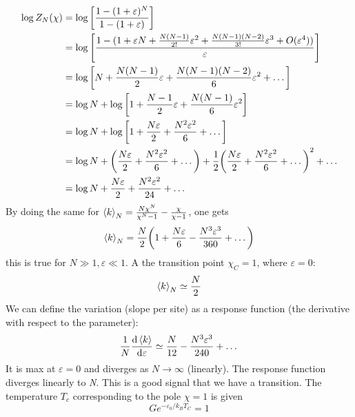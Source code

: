 \documentclass[../main/main.tex]{subfiles}
\begin{document}
\begin{equation}
\begin{split}
  \log{Z_N} (\chi)  &=  \log{\qty[\frac{1-(1+\varepsilon )^N}{1-(1+\varepsilon )}] }  \\
  & =   \log{\qty[\frac{1-(1+\varepsilon N  + \frac{N(N-1)}{2!}\varepsilon ^2 + \frac{N(N-1)(N-2)}{3!}\varepsilon ^3 +O(\varepsilon ^4))}{\varepsilon }] } \\
  & = \log{\qty[N + \frac{N(N-1)}{2}\varepsilon + \frac{N(N-1)(N-2)}{6}\varepsilon^2 + \dots]  } \\
  & = \log{N} + \log{\qty[1+\frac{N-1}{2}\varepsilon +\frac{N(N-1)}{6}\varepsilon ^2] } \\
  & = \log{N} + \log{\qty[1+ \frac{N \varepsilon }{2}+ \frac{N^2 \varepsilon ^2}{6}+ \dots] }  \\
  & = \log{N} + \qty( \frac{N \varepsilon }{2} + \frac{N^2 \varepsilon ^2}{6} + \dots) + \frac{1}{2} \qty(\frac{N \varepsilon }{2} + \frac{N^2 \varepsilon ^2}{6} + \dots)^2  + \dots  \\
  & = \log{N}+ \frac{N \varepsilon }{2} + \frac{N^2 \varepsilon ^2}{24} + \dots
\end{split}
\end{equation}
By doing the same for \(   \expval{k}_N = \frac{N \chi^N}{\chi^N-1} - \frac{\chi}{\chi-1} \), one gets
\begin{equation}
  \expval{k}_N = \frac{N}{2} \qty( 1 + \frac{N \varepsilon }{6} - \frac{N^3 \varepsilon ^3}{360} + \dots)
\end{equation}
this is true for \( N \gg 1, \varepsilon \ll 1 \).
A the transition point \( \chi _C =1 \), where \( \varepsilon =0 \):
\begin{equation}
  \expval{k}_N \simeq \frac{N}{2}
\end{equation}
We can define the variation (slope per site) as a response function (the derivative with respect to the parameter):
\begin{equation}
  \frac{1}{N}\dv{\expval{k} }{\varepsilon } \simeq \frac{N}{12} - \frac{N^3 \varepsilon ^3}{240} + \dots
\end{equation}
It is max at \( \varepsilon =0 \) and diverges as \( N \rightarrow \infty  \) (linearly). The response function diverges linearly to \emph{N}. This is a good signal that we have a transition.
The temperature \( T_c \) corresponding to the pole \( \chi=1 \) is given
  \begin{equation}
    G e^{-\varepsilon _0 /k_B T_C}  = 1
  \end{equation}
\end{document}
